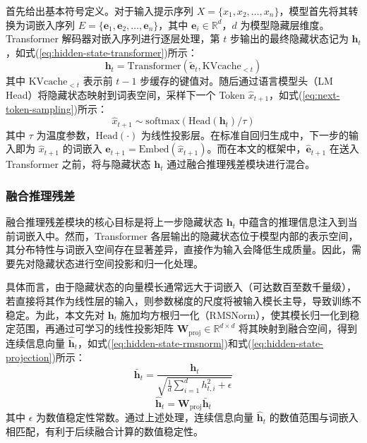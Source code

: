 首先给出基本符号定义。对于输入提示序列 $X = \{x_1, x_2, \ldots, x_n\}$，模型首先将其转换为词嵌入序列 $E = \{\mathbf{e}_1, \mathbf{e}_2, \ldots, \mathbf{e}_n\}$，其中 $\mathbf{e}_i \in \mathbb{R}^d$，$d$ 为模型隐藏层维度。Transformer 解码器对嵌入序列进行逐层处理，第 $t$ 步输出的最终隐藏状态记为 $\mathbf{h}_t$，如式(\ref{eq:hidden-state-transformer})所示：
\begin{equation}\label{eq:hidden-state-transformer}
  \mathbf{h}_t = \text{Transformer}(\tilde{\mathbf{e}}_t, \text{KVcache}_{<t})
\end{equation}
其中 $\text{KVcache}_{<t}$ 表示前 $t-1$ 步缓存的键值对。随后通过语言模型头（LM Head）将隐藏状态映射到词表空间，采样下一个 Token $\hat{x}_{t+1}$，如式(\ref{eq:next-token-sampling})所示：
\begin{equation}\label{eq:next-token-sampling}
  \hat{x}_{t+1} \sim \text{softmax}(\text{Head}(\mathbf{h}_t) / \tau)
\end{equation}
其中 $\tau$ 为温度参数，$\text{Head}(\cdot)$ 为线性投影层。在标准自回归生成中，下一步的输入即为 $\hat{x}_{t+1}$ 的词嵌入 $\hat{\mathbf{e}}_{t+1} = \text{Embed}(\hat{x}_{t+1})$。而在本文的框架中，$\hat{\mathbf{e}}_{t+1}$ 在送入 Transformer 之前，将与隐藏状态 $\mathbf{h}_t$ 通过融合推理残差模块进行混合。

\subsubsection{融合推理残差}

融合推理残差模块的核心目标是将上一步隐藏状态 $\mathbf{h}_t$ 中蕴含的推理信息注入到当前词嵌入中。然而，Transformer 各层输出的隐藏状态位于模型内部的表示空间，其分布特性与词嵌入空间存在显著差异，直接作为输入会降低生成质量。因此，需要先对隐藏状态进行空间投影和归一化处理。

具体而言，由于隐藏状态的向量模长通常远大于词嵌入（可达数百至数千量级），若直接将其作为线性层的输入，则参数梯度的尺度将被输入模长主导，导致训练不稳定。为此，本文先对 $\mathbf{h}_t$ 施加均方根归一化（RMSNorm），使其模长归一化到稳定范围，再通过可学习的线性投影矩阵 $\mathbf{W}_{\text{proj}} \in \mathbb{R}^{d \times d}$ 将其映射到融合空间，得到连续信息向量 $\hat{\mathbf{h}}_t$，如式(\ref{eq:hidden-state-rmsnorm})和式(\ref{eq:hidden-state-projection})所示：
\begin{equation}\label{eq:hidden-state-rmsnorm}
  \bar{\mathbf{h}}_t = \frac{\mathbf{h}_t}{\sqrt{\frac{1}{d}\sum_{i=1}^{d} h_{t,i}^2 + \epsilon}}
\end{equation}
\begin{equation}\label{eq:hidden-state-projection}
  \hat{\mathbf{h}}_t = \mathbf{W}_{\text{proj}} \bar{\mathbf{h}}_t
\end{equation}
其中 $\epsilon$ 为数值稳定性常数。通过上述处理，连续信息向量 $\hat{\mathbf{h}}_t$ 的数值范围与词嵌入相匹配，有利于后续融合计算的数值稳定性。

